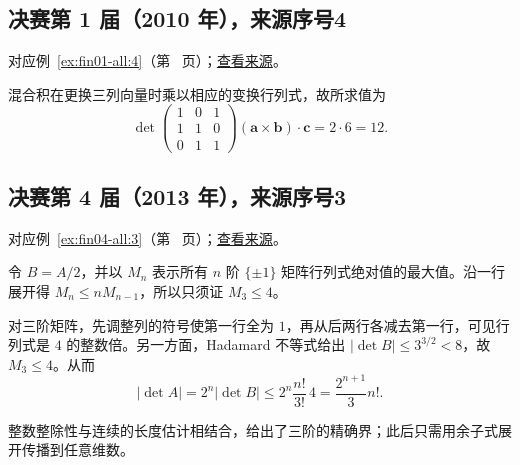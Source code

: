 \documentclass[UTF8,12pt,a4paper,fontset=fandol]{ctexart}
\begin{document}
\subsection{决赛第 1 届（2010 年），来源序号4}\label{ans:fin01-all:4}\label{pr:fin01-all:4}

对应例~\ref{ex:fin01-all:4}（第~\pageref{ex:fin01-all:4} 页）；\href{https://github.com/lzxcr/cmc-mathematics/blob/64916fa1fdbc3e444a652eca204d5669058ee321/src/problems/finals/01/04.md}{查看来源}。

\begin{solve}

混合积在更换三列向量时乘以相应的变换行列式，故所求值为
\[
\det\begin{pmatrix}1&0&1\\1&1&0\\0&1&1\end{pmatrix}
(\boldsymbol a\times\boldsymbol b)\cdot\boldsymbol c
=2\cdot6=12.
\]

\end{solve}

\subsection{决赛第 4 届（2013 年），来源序号3}\label{ans:fin04-all:3}\label{pr:fin04-all:3}

对应例~\ref{ex:fin04-all:3}（第~\pageref{ex:fin04-all:3} 页）；\href{https://github.com/lzxcr/cmc-mathematics/blob/64916fa1fdbc3e444a652eca204d5669058ee321/src/problems/finals/04/03.md}{查看来源}。

\begin{solve}

令 $B=A/2$，并以 $M_n$ 表示所有 $n$ 阶 $\{\pm1\}$ 矩阵行列式绝对值的最大值。沿一行展开得 $M_n\le nM_{n-1}$，所以只须证 $M_3\le4$。

对三阶矩阵，先调整列的符号使第一行全为 $1$，再从后两行各减去第一行，可见行列式是 $4$ 的整数倍。另一方面，Hadamard 不等式给出
$|\det B|\le3^{3/2}<8$，故 $M_3\le4$。从而
\[
|\det A|=2^n|\det B|\le2^n\frac{n!}{3!}\,4
=\frac{2^{n+1}}3n!.
\]

\end{solve}

\begin{remark}[方法与条件]

整数整除性与连续的长度估计相结合，给出了三阶的精确界；此后只需用余子式展开传播到任意维数。

\end{remark}
\end{document}
